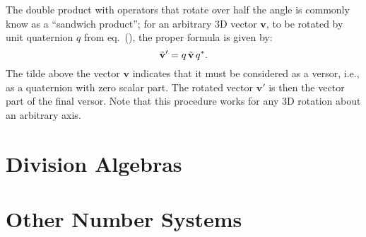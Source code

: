 The double product with operators that rotate over half the angle is commonly know as a ``sandwich product''; for an arbitrary 3D vector $\mathbf{v}$, to be rotated by unit quaternion $q$ from eq.~(), the proper formula is given by:
\begin{equation}
	\tilde{\mathbf{v}}' = q\,\tilde{\mathbf{v}}\,q^{\ast}.\OClabel{eq:quatvecrot}
\end{equation}
The tilde above the vector $\mathbf{v}$ indicates that it must be considered as a versor, i.e., as a quaternion with zero scalar part. The rotated vector $\mathbf{v}'$ is then the vector part of the final versor.  Note that this procedure works for any 3D rotation about an arbitrary axis.


\section{Division Algebras}



\section{Other Number Systems}








